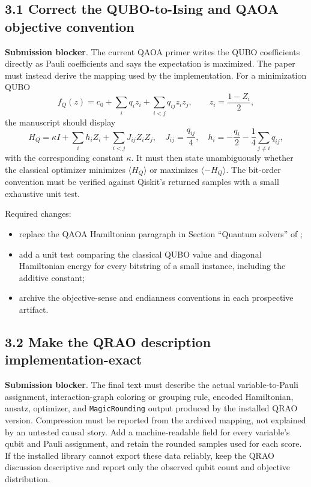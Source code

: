 \documentclass[11pt]{article}
\newcommand{\blocked}{\textcolor{blockred}{\textbf{Submission blocker}}}
\newcommand{\file}[1]{\path{#1}}
\begin{document}
\subsection*{3.1 Correct the QUBO-to-Ising and QAOA objective convention}

\blocked.  The current QAOA primer writes the QUBO coefficients directly as
Pauli coefficients and says the expectation is maximized.  The paper must
instead derive the mapping used by the implementation.  For a minimization
QUBO
\[
 f_Q(z)=c_0+\sum_i q_i z_i+\sum_{i<j}q_{ij}z_i z_j,
 \qquad z_i=\frac{1-Z_i}{2},
\]
the manuscript should display
\[
 H_Q=\kappa I+\sum_i h_i Z_i+\sum_{i<j}J_{ij}Z_iZ_j,
 \quad J_{ij}=\frac{q_{ij}}{4},
 \quad h_i=-\frac{q_i}{2}-\frac14\sum_{j\ne i}q_{ij},
\]
with the corresponding constant $\kappa$.  It must then state unambiguously
whether the classical optimizer minimizes $\langle H_Q\rangle$ or maximizes
$\langle -H_Q\rangle$.  The bit-order convention must be verified against
Qiskit's returned samples with a small exhaustive unit test.

Required changes:
\begin{itemize}
  \item replace the QAOA Hamiltonian paragraph in
  Section ``Quantum solvers'' of \file{main_2.tex};
  \item add a unit test comparing the classical QUBO value and diagonal
  Hamiltonian energy for every bitstring of a small instance, including the
  additive constant;
  \item archive the objective-sense and endianness conventions in each
  prospective artifact.
\end{itemize}

\subsection*{3.2 Make the QRAO description implementation-exact}

\blocked.  The final text must describe the actual variable-to-Pauli
assignment, interaction-graph coloring or grouping rule, encoded Hamiltonian,
ansatz, optimizer, and \texttt{MagicRounding} output produced by the installed
QRAO version.  Compression must be reported from the archived mapping, not
explained by an untested causal story.  Add a machine-readable field for every
variable's qubit and Pauli assignment, and retain the rounded samples used for
each score.  If the installed library cannot export these data reliably, keep
the QRAO discussion descriptive and report only the observed qubit count and
objective distribution.
\end{document}
